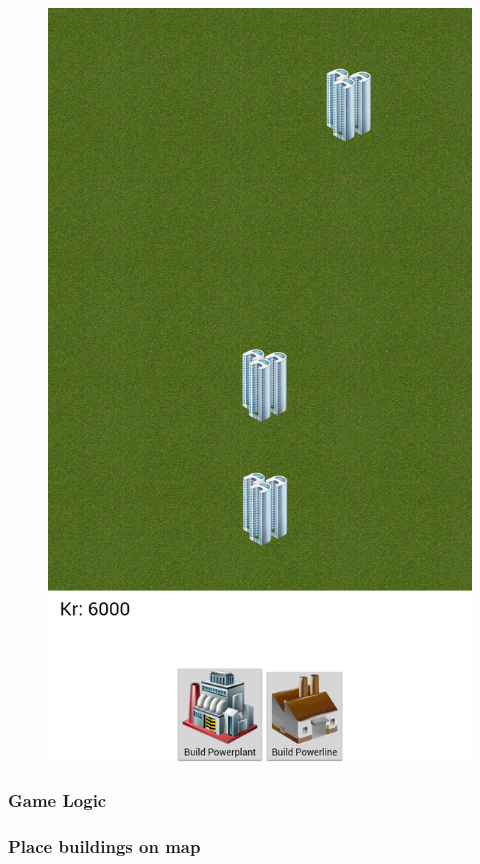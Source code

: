 \begin{figure}[!ht]
{	\includegraphics[scale=0.2]{pictures/game_screenshot_1}
}
\end{figure}

\subsubsection{Game Logic}
\subsubsection*{Place buildings on map}

